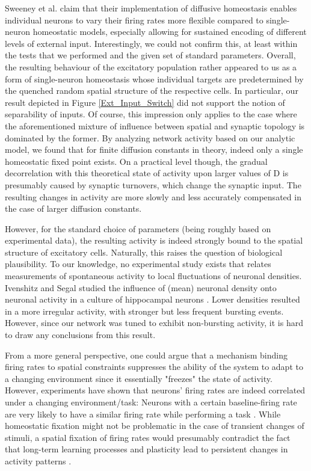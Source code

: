 \documentclass[10pt,a4paper]{article}
\begin{document}
Sweeney et al. claim that their implementation of diffusive homeostasis enables individual neurons to vary their firing rates more flexible compared to single-neuron homeostatic models, especially allowing for sustained encoding of different levels of external input. Interestingly, we could not confirm this, at least within the tests that we performed and the given set of standard parameters. Overall, the resulting behaviour of the excitatory population rather appeared to us as a form of single-neuron homeostasis whose individual targets are predetermined by the quenched random spatial structure of the respective cells. In particular, our result depicted in Figure \ref{Ext_Input_Switch} did not support the notion of separability of inputs. Of course, this impression only applies to the case where the aforementioned mixture of influence between spatial and synaptic topology is dominated by the former. By analyzing network activity based on our analytic model, we found that for finite diffusion constants in theory, indeed only a single homeostatic fixed point exists. On a practical level though, the gradual decorrelation with this theoretical state of activity upon larger values of $\mathrm{D}$ is presumably caused by synaptic turnovers, which change the synaptic input. The resulting changes in activity are more slowly and less accurately compensated in the case of larger diffusion constants. 

However, for the standard choice of parameters (being roughly based on experimental data), the resulting activity is indeed strongly bound to the spatial structure of excitatory cells. Naturally, this raises the question of biological plausibility. To our knowledge, no experimental study exists that relates measurements of spontaneous activity to local fluctuations of neuronal densities. Ivenshitz and Segal studied the influence of (mean) neuronal density onto neuronal activity in a culture of hippocampal neurons \cite{Ivenshitz_2010}. Lower densities resulted in a more irregular activity, with stronger but less frequent bursting events. However, since our network was tuned to exhibit non-bursting activity, it is hard to draw any conclusions from this result.

From a more general perspective, one could argue that a mechanism binding firing rates to spatial constraints suppresses the ability of the system to adapt to a changing environment since it essentially "freezes" the state of activity. However, experiments have shown that neurons' firing rates are indeed correlated under a changing environment/task: Neurons with a certain baseline-firing rate are very likely to have a similar firing rate while performing a task \cite{Buzsaki_Fir_Rates_2014}. While homeostatic fixation might not be problematic in the case of transient changes of stimuli, a spatial fixation of firing rates would presumably contradict the fact that long-term learning processes and plasticity lead to persistent changes in activity patterns \cite{Lever_Long_Term_Plast_2002}.
\end{document}
